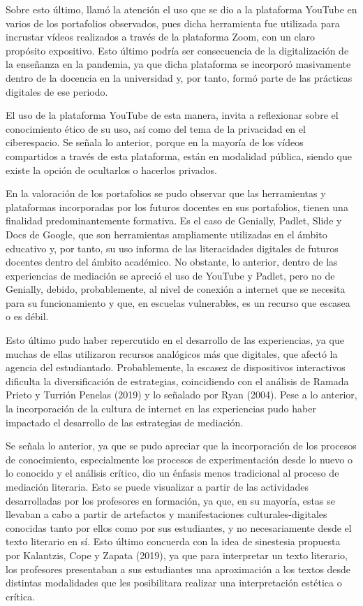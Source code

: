 Sobre esto último, llamó la atención el uso que se dio a la plataforma
YouTube en varios de los portafolios observados, pues dicha herramienta
fue utilizada para incrustar vídeos realizados a través de la plataforma
Zoom, con un claro propósito expositivo. Esto último podría ser
consecuencia de la digitalización de la enseñanza en la pandemia, ya que
dicha plataforma se incorporó masivamente dentro de la docencia en la
universidad y, por tanto, formó parte de las prácticas digitales de ese
periodo.

El uso de la plataforma YouTube de esta manera, invita a reflexionar
sobre el conocimiento ético de su uso, así como del tema de la
privacidad en el ciberespacio. Se señala lo anterior, porque en la
mayoría de los vídeos compartidos a través de esta plataforma, están en
modalidad pública, siendo que existe la opción de ocultarlos o hacerlos
privados.

En la valoración de los portafolios se pudo observar que las
herramientas y plataformas incorporadas por los futuros docentes en sus
portafolios, tienen una finalidad predominantemente formativa. Es el
caso de Genially, Padlet, Slide y Docs de Google, que son herramientas
ampliamente utilizadas en el ámbito educativo y, por tanto, su uso
informa de las literacidades digitales de futuros docentes dentro del
ámbito académico. No obstante, lo anterior, dentro de las experiencias
de mediación se apreció el uso de YouTube y Padlet, pero no de Genially,
debido, probablemente, al nivel de conexión a internet que se necesita
para su funcionamiento y que, en escuelas vulnerables, es un recurso que
escasea o es débil.

Esto último pudo haber repercutido en el desarrollo de las experiencias,
ya que muchas de ellas utilizaron recursos analógicos más que digitales,
que afectó la agencia del estudiantado. Probablemente, la escasez de
dispositivos interactivos dificulta la diversificación de estrategias,
coincidiendo con el análisis de Ramada Prieto y Turrión Penelas (2019) y
lo señalado por Ryan (2004). Pese a lo anterior, la incorporación de la
cultura de internet en las experiencias pudo haber impactado el
desarrollo de las estrategias de mediación.

Se señala lo anterior, ya que se pudo apreciar que la incorporación de
los procesos de conocimiento, especialmente los procesos de
experimentación desde lo nuevo o lo conocido y el análisis crítico, dio
un énfasis menos tradicional al proceso de mediación literaria. Esto se
puede visualizar a partir de las actividades desarrolladas por los
profesores en formación, ya que, en su mayoría, estas se llevaban a cabo
a partir de artefactos y manifestaciones culturales-digitales conocidas
tanto por ellos como por sus estudiantes, y no necesariamente desde el
texto literario en sí. Esto último concuerda con la idea de sinestesia
propuesta por Kalantzis, Cope y Zapata (2019), ya que para interpretar
un texto literario, los profesores presentaban a sus estudiantes una
aproximación a los textos desde distintas modalidades que les
posibilitara realizar una interpretación estética o crítica.

